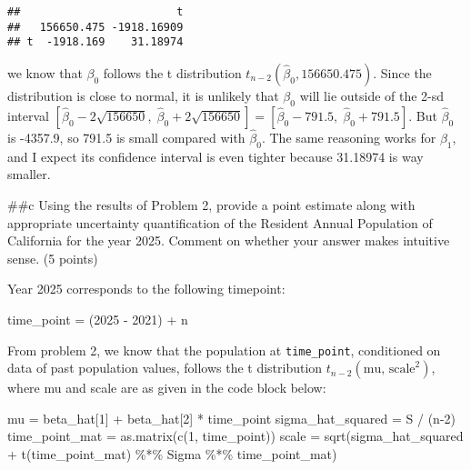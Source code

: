 \documentclass[
]{article}
\newenvironment{Shaded}{\begin{snugshade}}{\end{snugshade}}
\newcommand{\DecValTok}[1]{\textcolor[rgb]{0.00,0.00,0.81}{#1}}
\newcommand{\FunctionTok}[1]{\textcolor[rgb]{0.00,0.00,0.00}{#1}}
\newcommand{\NormalTok}[1]{#1}
\newcommand{\OtherTok}[1]{\textcolor[rgb]{0.56,0.35,0.01}{#1}}
\newcommand{\SpecialCharTok}[1]{\textcolor[rgb]{0.00,0.00,0.00}{#1}}
\begin{document}
\begin{verbatim}
##                        t
##   156650.475 -1918.16909
## t  -1918.169    31.18974
\end{verbatim}

we know that \(\beta_0\) follows the t distribution
\(t_{n-2}(\hat\beta_0, 156650.475)\). Since the distribution is close to
normal, it is unlikely that \(\beta_0\) will lie outside of the 2-sd
interval
\([\hat\beta_0 - 2\sqrt{156650},\; \hat\beta_0 + 2\sqrt{156650}] = [\hat\beta_0 - 791.5, \; \hat\beta_0 + 791.5]\).
But \(\hat\beta_0\) is -4357.9, so 791.5 is small compared with
\(\hat\beta_0\). The same reasoning works for \(\beta_1\), and I expect
its confidence interval is even tighter because 31.18974 is way smaller.

\#\#c Using the results of Problem 2, provide a point estimate along
with appropriate uncertainty quantification of the Resident Annual
Population of California for the year 2025. Comment on whether your
answer makes intuitive sense. (5 points)

Year 2025 corresponds to the following timepoint:

\begin{Shaded}
\begin{Highlighting}[]
\NormalTok{time\_point }\OtherTok{=}\NormalTok{ (}\DecValTok{2025} \SpecialCharTok{{-}} \DecValTok{2021}\NormalTok{) }\SpecialCharTok{+}\NormalTok{ n}
\end{Highlighting}
\end{Shaded}

From problem 2, we know that the population at \texttt{time\_point},
conditioned on data of past population values, follows the t
distribution \(t_{n-2}(\text{mu}, \,\text{scale}^2)\), where mu and
scale are as given in the code block below:

\begin{Shaded}
\begin{Highlighting}[]
\NormalTok{mu }\OtherTok{=}\NormalTok{ beta\_hat[}\DecValTok{1}\NormalTok{] }\SpecialCharTok{+}\NormalTok{ beta\_hat[}\DecValTok{2}\NormalTok{] }\SpecialCharTok{*}\NormalTok{ time\_point}
\NormalTok{sigma\_hat\_squared }\OtherTok{=}\NormalTok{ S }\SpecialCharTok{/}\NormalTok{ (n}\DecValTok{{-}2}\NormalTok{)}
\NormalTok{time\_point\_mat }\OtherTok{=} \FunctionTok{as.matrix}\NormalTok{(}\FunctionTok{c}\NormalTok{(}\DecValTok{1}\NormalTok{, time\_point))}
\NormalTok{scale }\OtherTok{=} \FunctionTok{sqrt}\NormalTok{(sigma\_hat\_squared }\SpecialCharTok{+} \FunctionTok{t}\NormalTok{(time\_point\_mat) }\SpecialCharTok{\%*\%}\NormalTok{ Sigma }\SpecialCharTok{\%*\%}\NormalTok{ time\_point\_mat)}
\end{Highlighting}
\end{Shaded}
\end{document}
